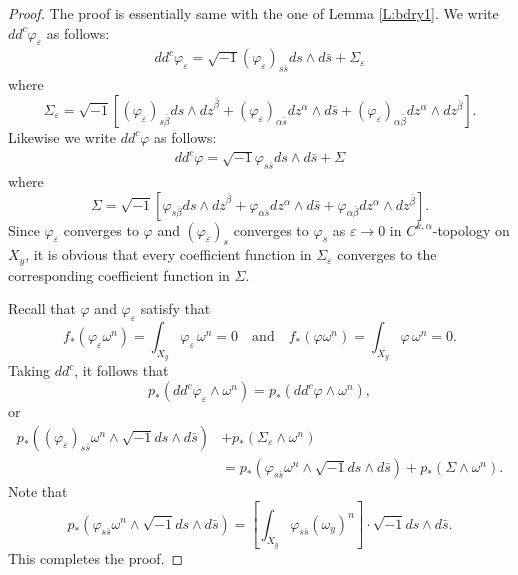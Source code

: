 \documentclass{amsart}
\theoremstyle{definition}
\numberwithin{equation}{section}
\begin{document}
\begin{proof}
The proof is essentially same with the one of Lemma \ref{L:bdry1}. We write $dd^c{\varphi}_{\varepsilon}$ as follows:
\begin{align*}
dd^c{\varphi}_{\varepsilon}
=
{\sqrt{-1}}({\varphi}_{\varepsilon})_{s\bar s}ds\wedge d\bar s
+
\Sigma_{\varepsilon}
\end{align*}
where
\begin{equation*}
\Sigma_{\varepsilon}
=
{\sqrt{-1}}{\left[{({\varphi}_{\varepsilon})_{s\bar\beta}ds\wedge{dz}^{\bar\beta} 
+({\varphi}_{\varepsilon})_{\alpha\bar s}dz^\alpha\wedge d\bar s
+({\varphi}_{\varepsilon})_{\alpha\bar\beta}dz^\alpha\wedge dz^{\bar\beta}
}\right]}.
\end{equation*}
Likewise we write $dd^c{\varphi}$ as follows:
\begin{align*}
dd^c{\varphi}
=
{\sqrt{-1}}{\varphi}_{s\bar s}ds\wedge d\bar s
+
\Sigma
\end{align*}
where
\begin{equation*}
\Sigma
=
{\sqrt{-1}}{\left[{{\varphi}_{s\bar\beta}ds\wedge{dz}^{\bar\beta} 
+{\varphi}_{\alpha\bar s}dz^\alpha\wedge d\bar s
+{\varphi}_{\alpha\bar\beta}dz^\alpha\wedge dz^{\bar\beta}
}\right]}.
\end{equation*}
Since ${\varphi}_{\varepsilon}$ converges to ${\varphi}$ and $({\varphi}_{\varepsilon})_s$ converges to ${\varphi}_s$ as ${\varepsilon}\rightarrow0$ in $C^{k,\alpha}$-topology on $X_y$, it is obvious that every coefficient function in $\Sigma_{\varepsilon}$ converges to the corresponding coefficient function in $\Sigma$.

Recall that ${\varphi}$ and ${\varphi}_{\varepsilon}$ satisfy that
\begin{equation*}
f_*({\varphi}_{\varepsilon}\omega^n)
=
\int_{X_y}{\varphi}_{\varepsilon}\,\omega^n
=0
\quad\text{and}\quad
f_*({\varphi}\omega^n)
=
\int_{X_y}{\varphi}\,\omega^n
=0.
\end{equation*}
Taking $dd^c$, it follows that
\begin{equation*}
p_*(dd^c{\varphi}_{\varepsilon}\wedge\omega^n)
=
p_*(dd^c{\varphi}\wedge\omega^n),
\end{equation*}
or
\begin{align*}
p_*{\left({({\varphi}_{\varepsilon})_{s\bar s}\omega^n\wedge
{\sqrt{-1}} ds\wedge d\bar s}\right)}
&+
p_*(\Sigma_{\varepsilon}\wedge\omega^n) 
\\
&=
p_*{\left({{\varphi}_{s\bar s}\omega^n\wedge
{\sqrt{-1}} ds\wedge d\bar s}\right)}
+
p_*(\Sigma\wedge\omega^n).
\end{align*}
Note that 
\begin{equation*}
p_*{\left({{\varphi}_{s\bar s}\omega^n\wedge
{\sqrt{-1}} ds\wedge d\bar s}\right)}
=
{\left[{
	\int_{X_y}{\varphi}_{s\bar s}(\omega_y)^n
}\right]}
\cdot{\sqrt{-1}} ds\wedge d\bar s.
\end{equation*}
This completes the proof.
\end{proof}
\end{document}
